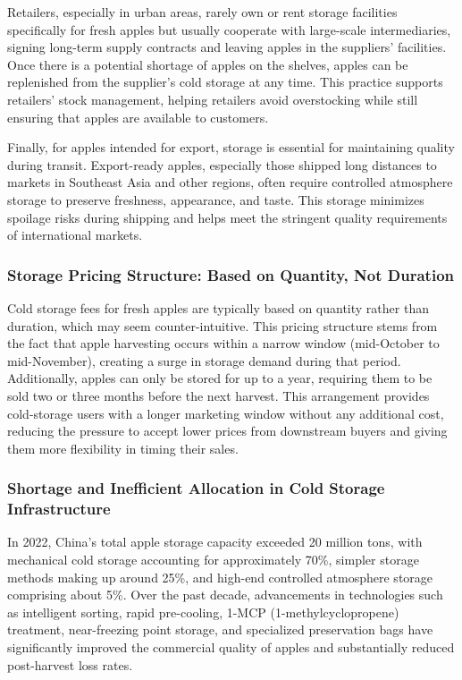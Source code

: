 Retailers, especially in urban areas, rarely own or rent storage facilities specifically for fresh apples but usually cooperate with large-scale intermediaries, signing long-term supply contracts and leaving apples in the suppliers' facilities. Once there is a potential shortage of apples on the shelves, apples can be replenished from the supplier's cold storage at any time. This practice supports retailers' stock management, helping retailers avoid overstocking while still ensuring that apples are available to customers.

Finally, for apples intended for export, storage is essential for maintaining quality during transit. Export-ready apples, especially those shipped long distances to markets in Southeast Asia and other regions, often require controlled atmosphere storage to preserve freshness, appearance, and taste. This storage minimizes spoilage risks during shipping and helps meet the stringent quality requirements of international markets.




\subsubsection{Storage Pricing Structure: Based on Quantity, Not Duration} 
\noindent Cold storage fees for fresh apples are typically based on quantity rather than duration, which may seem counter-intuitive. This pricing structure stems from the fact that apple harvesting occurs within a narrow window (mid-October to mid-November), creating a surge in storage demand during that period. Additionally, apples can only be stored for up to a year, requiring them to be sold two or three months before the next harvest. This arrangement provides cold-storage users with a longer marketing window without any additional cost, reducing the pressure to accept lower prices from downstream buyers and giving them more flexibility in timing their sales.

\subsubsection{Shortage and Inefficient Allocation in Cold Storage Infrastructure} 
\noindent In 2022, China’s total apple storage capacity exceeded 20 million tons, with mechanical cold storage accounting for approximately 70\%, simpler storage methods making up around 25\%, and high-end controlled atmosphere storage comprising about 5\%. Over the past decade, advancements in technologies such as intelligent sorting, rapid pre-cooling, 1-MCP (1-methylcyclopropene) treatment, near-freezing point storage, and specialized preservation bags have significantly improved the commercial quality of apples and substantially reduced post-harvest loss rates.

